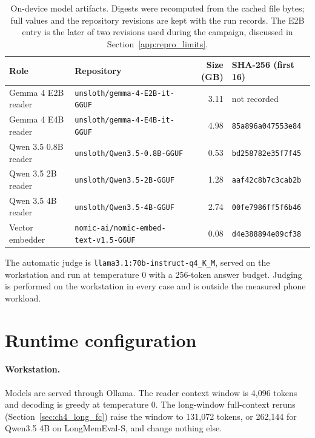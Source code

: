 \begin{table}[htbp]
  \centering
  \small
  \begin{tabular}{llrl}
    \toprule
    Role & Repository & Size (GB) & SHA-256 (first 16) \\
    \midrule
    Gemma 4 E2B reader & \texttt{unsloth/gemma-4-E2B-it-GGUF} & 3.11 & not recorded \\
    Gemma 4 E4B reader & \texttt{unsloth/gemma-4-E4B-it-GGUF} & 4.98 & \texttt{85a896a047553e84} \\
    Qwen 3.5 0.8B reader & \texttt{unsloth/Qwen3.5-0.8B-GGUF} & 0.53 & \texttt{bd258782e35f7f45} \\
    Qwen 3.5 2B reader & \texttt{unsloth/Qwen3.5-2B-GGUF} & 1.28 & \texttt{aaf42c8b7c3cab2b} \\
    Qwen 3.5 4B reader & \texttt{unsloth/Qwen3.5-4B-GGUF} & 2.74 & \texttt{00fe7986ff5f6b46} \\
    Vector embedder & \texttt{nomic-ai/nomic-embed-text-v1.5-GGUF} & 0.08 & \texttt{d4e388894e09cf38} \\
    \bottomrule
  \end{tabular}
  \caption{On-device model artifacts. Digests were recomputed from the cached file bytes;
           full values and the repository revisions are kept with the run records. The E2B
           entry is the later of two revisions used during the campaign, discussed in
           Section~\ref{app:repro_limits}.}
  \label{tab:app_artifacts}
\end{table}

The automatic judge is \texttt{llama3.1:70b-instruct-q4\_K\_M}, served on the workstation and
run at temperature 0 with a 256-token answer budget. Judging is performed on the workstation
in every case and is outside the measured phone workload.

\section{Runtime configuration}
\label{app:repro_runtime}

\paragraph{Workstation.} Models are served through Ollama. The reader context window is
4,096 tokens and decoding is greedy at temperature 0. The long-window full-context reruns
(Section~\ref{sec:ch4_long_fc}) raise the window to 131,072 tokens, or 262,144 for Qwen3.5 4B on
LongMemEval-S, and change nothing else.

